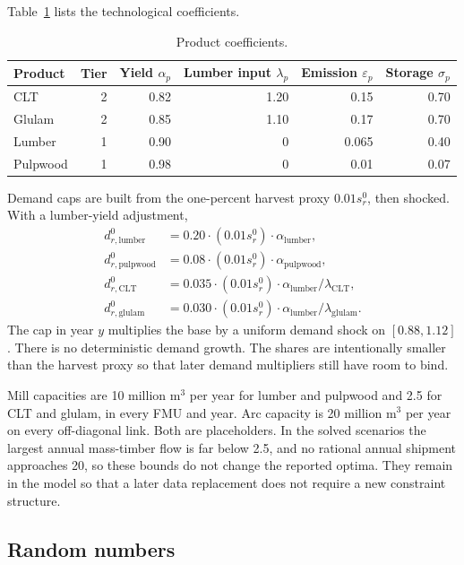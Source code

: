 \documentclass[11pt]{article}
\begin{document}
Table~\ref{tab:tech} lists the technological coefficients.

\begin{table}[ht]
\centering
\caption{Product coefficients.}
\label{tab:tech}
\begin{tabular}{lrrrrr}
\toprule
Product & Tier & Yield $\alpha_p$ & Lumber input $\lambda_p$ & Emission $\varepsilon_p$ & Storage $\sigma_p$ \\
\midrule
CLT & 2 & 0.82 & 1.20 & 0.15 & 0.70 \\
Glulam & 2 & 0.85 & 1.10 & 0.17 & 0.70 \\
Lumber & 1 & 0.90 & 0 & 0.065 & 0.40 \\
Pulpwood & 1 & 0.98 & 0 & 0.01 & 0.07 \\
\bottomrule
\end{tabular}
\end{table}

Demand caps are built from the one-percent harvest proxy $0.01 s^0_r$, then shocked. With a lumber-yield adjustment,
\begin{align*}
d^{0}_{r,\mathrm{lumber}} &= 0.20 \cdot (0.01 s^0_r) \cdot \alpha_{\mathrm{lumber}}, \\
d^{0}_{r,\mathrm{pulpwood}} &= 0.08 \cdot (0.01 s^0_r) \cdot \alpha_{\mathrm{pulpwood}}, \\
d^{0}_{r,\mathrm{CLT}} &= 0.035 \cdot (0.01 s^0_r) \cdot \alpha_{\mathrm{lumber}} / \lambda_{\mathrm{CLT}}, \\
d^{0}_{r,\mathrm{glulam}} &= 0.030 \cdot (0.01 s^0_r) \cdot \alpha_{\mathrm{lumber}} / \lambda_{\mathrm{glulam}}.
\end{align*}
The cap in year $y$ multiplies the base by a uniform demand shock on $[0.88, 1.12]$. There is no deterministic demand growth. The shares are intentionally smaller than the harvest proxy so that later demand multipliers still have room to bind.

Mill capacities are 10 million m$^3$ per year for lumber and pulpwood and 2.5 for CLT and glulam, in every FMU and year. Arc capacity is 20 million m$^3$ per year on every off-diagonal link. Both are placeholders. In the solved scenarios the largest annual mass-timber flow is far below 2.5, and no rational annual shipment approaches 20, so these bounds do not change the reported optima. They remain in the model so that a later data replacement does not require a new constraint structure.

\subsection{Random numbers}
\end{document}
